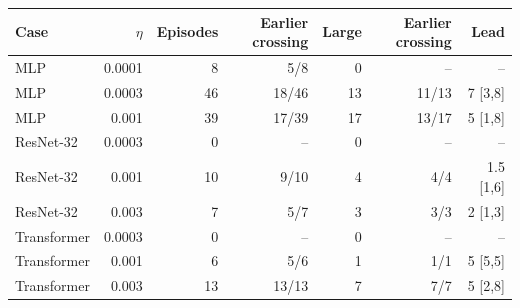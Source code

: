 \begin{tabular}{lrrrrrr}
\hline
Case & $\eta$ & Episodes & Earlier crossing & Large & Earlier crossing & Lead \\
\hline
MLP & 0.0001 & 8 & 5/8 & 0 & -- & -- \\
MLP & 0.0003 & 46 & 18/46 & 13 & 11/13 & 7 [3,8] \\
MLP & 0.001 & 39 & 17/39 & 17 & 13/17 & 5 [1,8] \\
ResNet-32 & 0.0003 & 0 & -- & 0 & -- & -- \\
ResNet-32 & 0.001 & 10 & 9/10 & 4 & 4/4 & 1.5 [1,6] \\
ResNet-32 & 0.003 & 7 & 5/7 & 3 & 3/3 & 2 [1,3] \\
Transformer & 0.0003 & 0 & -- & 0 & -- & -- \\
Transformer & 0.001 & 6 & 5/6 & 1 & 1/1 & 5 [5,5] \\
Transformer & 0.003 & 13 & 13/13 & 7 & 7/7 & 5 [2,8] \\
\hline
\end{tabular}
